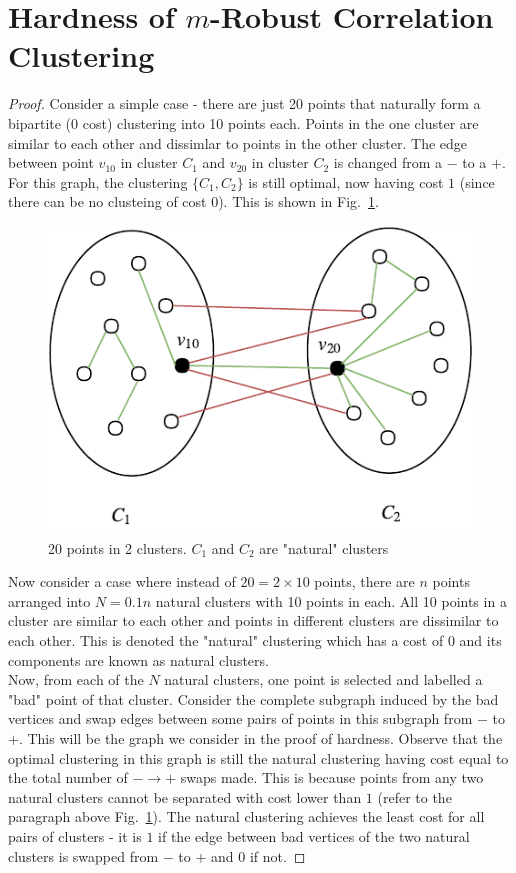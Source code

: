 \section{Hardness of $m$-Robust Correlation Clustering}

\begin{proof}
Consider a simple case - there are just 20 points that naturally form a bipartite ($0$ cost) clustering into 10 points each. Points in the one cluster are similar to each other and dissimlar to points in the other cluster. The edge between point $v_{10}$ in cluster $C_1$ and $v_{20}$ in cluster $C_2$ is changed from a $-$ to a $+$. For this graph, the clustering $\{ C_1,C_2 \}$ is still optimal, now having cost $1$ (since there can be no clusteing of cost $0$). This is shown in Fig.~\ref{fig:1}.

\begin{figure}[ht]
\centering
\includegraphics{./img/bipartite.pdf}
\caption{20 points in 2 clusters. $C_1$ and $C_2$ are "natural" clusters}
\label{fig:1}
\end{figure}

Now consider a case where instead of $20 = 2 \times 10$ points, there are $n$ points arranged into $N = 0.1n$ natural clusters with 10 points in each. All 10 points in a cluster are similar to each other and points in different clusters are dissimilar to each other. This is denoted the "natural" clustering which has a cost of $0$ and its components are known as natural clusters.\\

\noindent Now, from each of the $N$ natural clusters, one point is selected and labelled a "bad" point of that cluster. Consider the complete subgraph induced by the bad vertices and swap edges between some pairs of points in this subgraph from $-$ to $+$. This will be the graph we consider in the proof of hardness. Observe that the optimal clustering in this graph is still the natural clustering having cost equal to the total number of $- \to +$ swaps made. This is because points from any two natural clusters cannot be separated with cost lower than $1$ (refer to the paragraph above Fig.~\ref{fig:1}). The natural clustering achieves the least cost for all pairs of clusters - it is $1$ if the edge between bad vertices of the two natural clusters is swapped from $-$ to $+$ and $0$ if not.


\end{proof}
